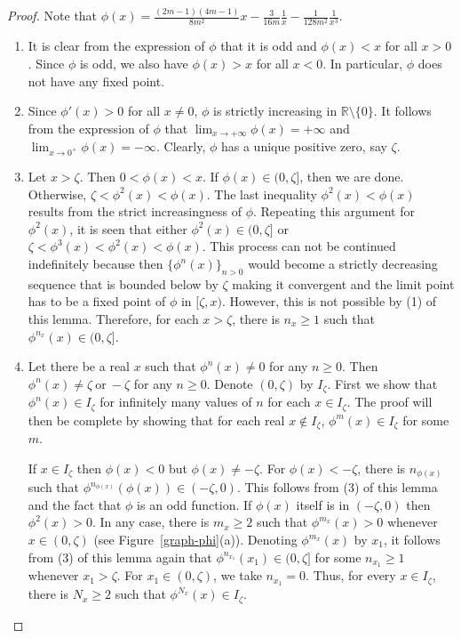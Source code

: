 \documentclass[12pt]{article}
\begin{document}
\begin{proof} Note that $\phi(x)=\frac{ (2m -1)(4m -1)}{8m^2}x-\frac{3}{16m }\frac{1}{x} -\frac{1}{128m^2 }\frac{1}{x^3}.$
\begin{enumerate}
\item 
		It is clear from the expression of $\phi$ that it is odd and $\phi(x)<x$ for all $x>0$. Since $\phi$ is odd, we also have $\phi(x) > x$ for all $x<0$. In particular, $\phi$ does not have any fixed point.
\item Since $\phi '(x)>0$ for all $x \neq 0$, $\phi$ is strictly increasing in $\mathbb{R} \setminus \{0\}$. It follows from the expression of $\phi$ that  $\lim_{x \to +\infty} \phi(x) = +\infty$ and $\lim_{x \to 0^+} \phi(x) = -\infty$. Clearly, $\phi$ has a unique positive zero, say $\zeta$.
\item Let $x> \zeta$. Then    $0<\phi (x)<x$. If
		$\phi (x)   \in (0,\zeta]$, then we are done. Otherwise,  $\zeta < \phi^2 (x)< \phi(x)$. The last inequality $\phi^2 (x)< \phi(x)$ results from the strict increasingness of $\phi$.  Repeating this argument for $\phi^2 (x)$, it is seen that either $\phi^2 (x) \in (0, \zeta]$ or  $\zeta < \phi^3 (x)< \phi^2(x) < \phi(x)$. This process can not be continued indefinitely because then $\{\phi^n (x)\}_{n>0}$ would become a strictly decreasing sequence that is bounded below by $\zeta$ making it convergent and the limit point has to be a fixed point of $\phi$ in $[\zeta, x)$.  However, this is not possible by (1) of this lemma. Therefore, for each $x>\zeta$,   there is  $n_x \geq 1$ such that $\phi^{n_x}(x) \in (0, \zeta]$.
		\item 
		Let there be a real $x$ such that $\phi^n (x) \neq 0$ for any $n \geq 0$. Then  $\phi^n (x) \neq \zeta~\mbox{or}~-\zeta$ for any $n \geq 0$. Denote $(0, \zeta)$ by $I_\zeta$.  First we show that  $\phi^n (x) \in I_\zeta$ for infinitely many values of $n$ for each $x \in I_\zeta$. The  proof will then be complete by showing that for each real $x \notin I_\zeta$, $\phi^m (x) \in I_\zeta$ for some $m$.

\par  If $x \in I_\zeta$ then $\phi(x)<0$ but  $\phi(x) \neq -\zeta$. For $\phi(x) < -\zeta$, there is $n_{\phi(x)}$ such that $\phi^{n_{\phi(x)}} (\phi(x)) \in (-\zeta,0)$. This follows from (3) of this lemma and the fact that $\phi$ is an odd function.   If $\phi(x)$ itself  is in $(-\zeta, 0)$ then $\phi^{2}(x)>0$. In any case, there is $m_x \geq 2$ such that 
$\phi^{m_{x}} (x)>0$ whenever $x \in (0,\zeta)$ (see Figure~\ref{graph-phi}(a)). Denoting $\phi^{m_{x}} (x)$ by $x_1$,  it follows from (3) of this lemma again that $\phi^{n_{x_1}}(x_1) \in (0, \zeta]$ for some $n_{x_1} \geq 1$    whenever $x_1 >\zeta$. For $x_1 \in (0, \zeta)$,  we take $n_{x_1}=0$. Thus, for every $x \in I_\zeta$, there is $N_x \geq 2$ such that $\phi^{N_x}(x) \in I_\zeta$. 
		

\end{enumerate}
\end{proof}
\end{document}
